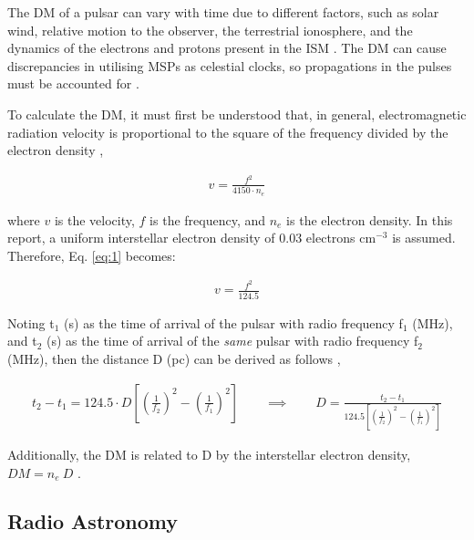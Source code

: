 \documentclass[12pt]{article}
\begin{document}
The DM of a pulsar can vary with time due to different factors, such as solar wind, relative motion to the observer, the terrestrial ionosphere, and the dynamics of the electrons and protons present in the ISM \cite{keith2013measurement,interstellardispersion2}. The DM can cause discrepancies in utilising MSPs as celestial clocks, so propagations in the pulses must be accounted for \cite{keith2013measurement}.

To calculate the DM, it must first be understood that, in general, electromagnetic radiation velocity is proportional to the square of the frequency divided by the electron density \cite{UCDpulsars},

\vspace{-2ex}
\begin{gather} \label{eq:1}
    v = \frac{f^2}{4150 \cdot n_e}
\end{gather}

where $v$ is the velocity, $f$ is the frequency, and $n_e$ is the electron density. In this report, a uniform interstellar electron density of 0.03 electrons cm$^{-3}$ is assumed. Therefore, Eq. \ref{eq:1} becomes:

\vspace{-2ex}
\begin{gather}
    v = \frac{f^2}{124.5}
\end{gather}

Noting t$_1$ (s) as the time of arrival of the pulsar with radio frequency f$_1$ (MHz), and t$_2$ (s) as the time of arrival of the \textit{same} pulsar with radio frequency f$_2$ (MHz), then the distance D (pc) can be derived as follows \cite{UCDpulsars,interstellardispersion},

\vspace{-2ex}
\begin{gather} \label{eq:3}
    t_2 - t_1 = 124.5 \cdot D \left[ \left( \frac{1}{f_2} \right)^2 - \left( \frac{1}{f_1} \right)^2 \right] \qquad \implies \qquad D = \frac{t_2 - t_1}{124.5 \left[ \left( \frac{1}{f_2} \right)^2 - \left( \frac{1}{f_1} \right)^2 \right]}
\end{gather}

Additionally, the DM is related to D by the interstellar electron density, $DM = n_e \: D$ \cite{interstellardispersion}.

\subsection{Radio Astronomy}
\end{document}

